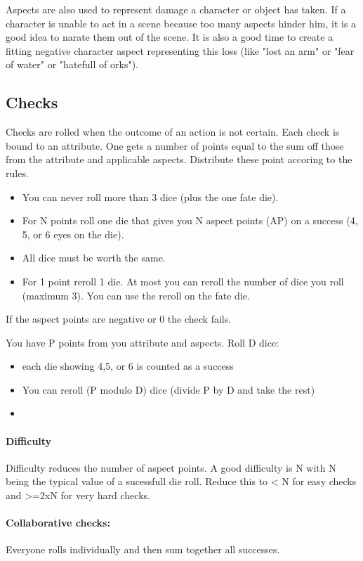 \documentclass[11pt]{article}
\begin{document}
{Aspects are also used to represent damage a character or object has taken. If a character is unable to act in a scene because too many aspects hinder him, it is a good idea to narate them out of the scene. It is also a good time to create a fitting negative character aspect representing this loss (like "lost an arm" or "fear of water" or "hatefull of orks").


\subsection{Checks}
\label{sec:org06c2956}
Checks are rolled when the outcome of an action is not certain. Each check is bound to an attribute.
One gets a number of points equal to the sum off those from the attribute and applicable aspects. Distribute these point accoring to the rules.
\begin{itemize}
\item You can never roll more than 3 dice (plus the one fate die).
\item For N points roll one die that gives you N aspect points (AP) on a success (4, 5, or 6 eyes on the die).
\item All dice must be worth the same.
\item For 1 point reroll 1 die. At most you can reroll the number of dice you roll (maximum 3). You can use the reroll on the fate die.
\end{itemize}
If the aspect points are negative or 0 the check fails. 


You have P points from you attribute and aspects. 
Roll D dice:
\begin{itemize}
\item each die showing 4,5, or 6 is counted as a success
\item You can reroll (P modulo D) dice (divide P by D and take the rest)
\item 
\end{itemize}


\paragraph*{Difficulty}
\label{sec:orgfae05ae}
Difficulty reduces the number of aspect points. A good difficulty is N with N being the typical value of a sucessfull die roll. Reduce this to < N for easy checks and >=2xN for very hard checks.

\paragraph*{Collaborative checks:}
\label{sec:orgaa8f5be}
Everyone rolls individually and then sum together all successes.

}
\end{document}
